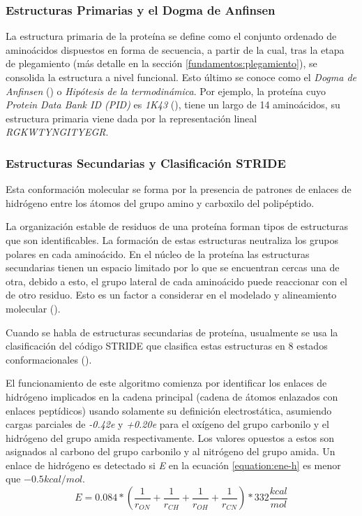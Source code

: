 \subsubsection{Estructuras Primarias y el Dogma de Anfinsen}
La estructura primaria de la proteína se define como el conjunto ordenado de aminoácidos dispuestos en forma de secuencia, a partir de la cual, tras la etapa de plegamiento (más detalle en la sección \ref{fundamentos:plegamiento}), se consolida la estructura a nivel funcional. Esto último se conoce como el \textit{Dogma de Anfinsen} (\citealp{Anfinsen:1973}) o \textit{Hipótesis de la termodinámica}. Por ejemplo, la proteína cuyo \textit{Protein Data Bank ID (PID)} es \textit{1K43} (\citealp{1k43}), tiene un largo de 14 aminoácidos, su estructura primaria viene dada por la representación lineal \textit{RGKWTYNGITYEGR}.

\subsubsection{Estructuras Secundarias y Clasificaci\'on STRIDE}
\label{cap:dssp}

Esta conformación molecular se forma por la presencia de patrones de enlaces de hidrógeno entre los átomos del grupo amino y carboxilo del polipéptido.

La organización estable de residuos de una proteína forman tipos de estructuras que son identificables. La formación de estas estructuras neutraliza los grupos polares en cada aminoácido. En el núcleo de la proteína las estructuras secundarias tienen un espacio limitado por lo que se encuentran cercas una de otra, debido a esto, el grupo lateral de cada aminoácido puede reaccionar con el de otro residuo. Esto es un factor a considerar en el modelado y alineamiento molecular (\citealp{molecular:book}).

Cuando se habla de estructuras secundarias de proteína, usualmente se usa la clasificación del código STRIDE que clasifica estas estructuras en 8 estados conformacionales (\citealp{stridepaper}).


El funcionamiento de este algoritmo comienza por identificar los enlaces de hidrógeno implicados en la cadena principal (cadena de átomos enlazados con enlaces peptídicos) usando solamente su definición electrostática, asumiendo cargas parciales de \textit{-0.42e} y \textit{+0.20e} para el oxígeno del grupo carbonilo y el hidrógeno del grupo amida respectivamente. Los valores opuestos a estos son asignados al carbono del grupo carbonilo y al nitrógeno del grupo amida. Un enlace de hidrógeno es detectado si \textit{E} en la ecuación \ref{equation:ene-h} es menor que $-0.5kcal/mol$. 
\begin{equation}
	E=0.084*(\frac{1}{r_{ON}}+\frac{1}{r_{CH}}+\frac{1}{r_{OH}}+\frac{1}{r_{CN}})*332\frac{kcal}{mol}
	\label{equation:ene-h}
\end{equation}

